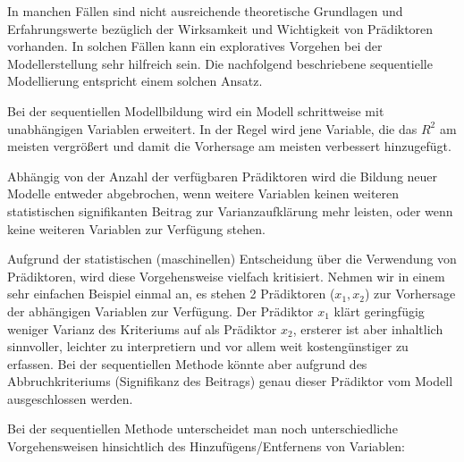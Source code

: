 \documentclass[]{article}
\begin{document}
In manchen Fällen sind nicht ausreichende theoretische Grundlagen und Erfahrungswerte bezüglich der Wirksamkeit und Wichtigkeit von Prädiktoren vorhanden. In solchen Fällen kann ein exploratives Vorgehen bei der Modellerstellung sehr hilfreich sein. Die nachfolgend beschriebene sequentielle Modellierung entspricht einem solchen Ansatz.

Bei der sequentiellen Modellbildung wird ein Modell schrittweise mit unabhängigen Variablen erweitert. In der Regel wird jene Variable, die das \(R^2\) am meisten vergrößert und damit die Vorhersage am meisten verbessert hinzugefügt.

Abhängig von der Anzahl der verfügbaren Prädiktoren wird die Bildung neuer Modelle entweder abgebrochen, wenn weitere Variablen keinen weiteren statistischen signifikanten Beitrag zur Varianzaufklärung mehr leisten, oder wenn keine weiteren Variablen zur Verfügung stehen.

Aufgrund der statistischen (maschinellen) Entscheidung über die Verwendung von Prädiktoren, wird diese Vorgehensweise vielfach kritisiert. Nehmen wir in einem sehr einfachen Beispiel einmal an, es stehen 2 Prädiktoren (\(x_1, x_2\)) zur Vorhersage der abhängigen Variablen zur Verfügung. Der Prädiktor \(x_1\) klärt geringfügig weniger Varianz des Kriteriums auf als Prädiktor \(x_2\), ersterer ist aber inhaltlich sinnvoller, leichter zu interpretiern und vor allem weit kostengünstiger zu erfassen. Bei der sequentiellen Methode könnte aber aufgrund des Abbruchkriteriums (Signifikanz des Beitrags) genau dieser Prädiktor vom Modell ausgeschlossen werden.

Bei der sequentiellen Methode unterscheidet man noch unterschiedliche Vorgehensweisen hinsichtlich des Hinzufügens/Entfernens von Variablen:
\end{document}
